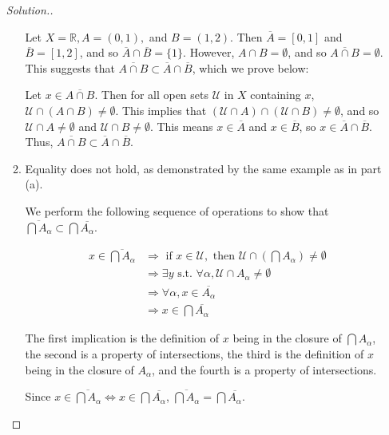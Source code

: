 \documentclass{article}
\newcommand{\U}{\mathcal{U}}
\newcommand{\R}{\mathbb{R}}
\newcommand{\sk}{\smallskip}
\begin{document}
\begin{enumerate}
\begin{proof}[Solution.]
\begin{enumerate}
            Let $X = \R, A = (0, 1),$ and $B = (1, 2)$. Then $\overline{A} = [0, 1]$ and $\overline{B} = [1, 2]$, and so $\overline{A} \cap \overline{B} = \{1\}$. However, $A \cap B = \emptyset$, and so $\overline{A \cap B} = \emptyset$. This suggests that $\overline{A \cap B} \subset \overline{A} \cap \overline{B}$, which we prove below: 

            \sk 

            Let $x \in \overline{A \cap B}$. Then for all open sets $\U$ in $X$ containing $x$, $\U \cap (A \cap B) \neq \emptyset$. This implies that $(\U \cap A) \cap (\U \cap B) \neq \emptyset$, and so $\U \cap A \neq \emptyset$ and $\U \cap B \neq \emptyset$. This means $x \in \overline{A}$ and $x \in \overline{B}$, so $x \in \overline{A} \cap \overline{B}$. Thus, $\overline{A \cap B} \subset \overline{A} \cap \overline{B}$.

            \item Equality does not hold, as demonstrated by the same example as in part (a).

            \sk
            
            
            We perform the following sequence of operations  to show that $\overline{\bigcap A_\alpha} \subset \bigcap \overline{A_\alpha}$.

            \begin{align*}
                x \in \overline{\bigcap A_\alpha} &\Rightarrow \text{ if }x \in \U, \text{ then } \U \cap \left(\bigcap A_\alpha\right) \neq \emptyset\\
                &\Rightarrow \exists y \text{ s.t. }\forall \alpha,  \U \cap A_\alpha \neq \emptyset \\
                &\Rightarrow \forall \alpha, x \in \overline{A_\alpha} \\
                &\Rightarrow x \in \bigcap \overline{A_\alpha}
            \end{align*}

            The first implication is the definition of $x$ being in the closure of $\bigcap A_\alpha$, the second is a property of intersections, the third is the definition of $x$ being in the closure of $A_\alpha$, and the fourth is a property of intersections. 

            \sk

            Since $x \in \overline{\bigcap A_\alpha} \Leftrightarrow x \in \bigcap \overline{A_\alpha}$, $\overline{\bigcap A_\alpha} = \bigcap \overline{A_\alpha}$. 


\end{enumerate}
\end{proof}
\end{enumerate}
\end{document}
